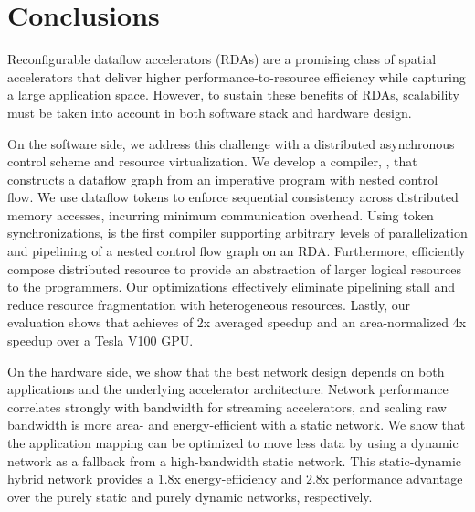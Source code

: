 \chapter{Conclusions} \label{sec:conclusion}

Reconfigurable dataflow accelerators (RDAs) are a promising class of spatial accelerators that deliver higher performance-to-resource efficiency while capturing a large application space.
However, to sustain these benefits of RDAs, scalability must be taken into account in both software
stack and hardware design.

On the software side, we address this challenge with a distributed asynchronous control scheme and resource
virtualization.
We develop a compiler, \name{}, that constructs a dataflow graph from an imperative program with nested
control flow. We use dataflow tokens to enforce sequential consistency across distributed memory
accesses, incurring minimum communication overhead.
Using token synchronizations, \name is the first compiler supporting arbitrary levels of parallelization and pipelining 
of a nested control flow graph on an RDA.
Furthermore, \name efficiently compose distributed resource to provide an abstraction of larger
logical resources to the programmers.
Our optimizations effectively eliminate pipelining stall and reduce resource fragmentation with
heterogeneous resources.
Lastly, our evaluation shows that \name{} achieves of 2x averaged speedup and an area-normalized 4x
speedup over a Tesla V100 GPU.

On the hardware side, we show that the best network design depends on both applications and the underlying accelerator architecture.
Network performance correlates strongly with bandwidth for streaming accelerators, and scaling raw bandwidth is more area- and energy-efficient with a static network.
We show that the application mapping can be optimized to move less data by using a dynamic network as a fallback from a high-bandwidth static network.
This static-dynamic hybrid network provides a 1.8x energy-efficiency and
2.8x performance advantage over the purely static and purely dynamic networks, respectively.


